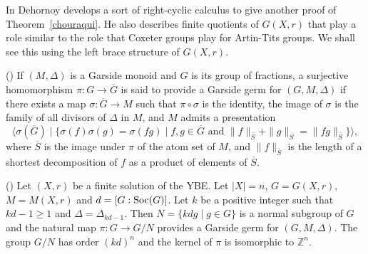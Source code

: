 In \cite{MR3374524} Dehornoy develops a sort of right-cyclic calculus to
give another proof of Theorem~\ref{chouraqui}. He also describes
finite quotients of $G(X,r)$ that play a role similar to the role
that Coxeter groups play for Artin-Tits groups. We shall see this
using the left brace structure of $G(X,r)$.

\begin{definition} (\cite[Definition~5.1]{MR3374524}) If $(M,\Delta)$ is a Garside
monoid and $G$ is its group of fractions, a surjective homomorphism
$\pi\colon G\longrightarrow \overline{G}$ is said to provide a
Garside germ for $(G,M,\Delta)$ if there exists a map
$\sigma\colon\overline{G}\longrightarrow M$ such that
$\pi\circ\sigma$ is the identity, the image of $\sigma$ is the
family of all divisors of $\Delta$ in $M$, and $M$ admits a
presentation
$$\langle \sigma(\overline{G})\mid \{ \sigma(f)\sigma(g)=\sigma(fg)\mid f,g\in \overline{G}\mbox{ and }\| f\|_{\overline{S}}+\| g\|_{\overline{S}}=\| fg\|_{\overline{S}} \}\rangle,$$
where $\overline{S}$ is the image under $\pi$ of the atom set of
$M$, and $\| f\|_{\overline{S}}$ is the length of a shortest
decomposition of $f$ as a product of elements of $\overline{S}$.
\end{definition}

\begin{proposition} (\cite[Proposition~5.2]{MR3374524}) Let $(X,r)$ be a finite
solution of the YBE. Let $|X|=n$, $G=G(X,r)$, $M=M(X,r)$ and $d=[G
:\operatorname{Soc}(G)]$. Let $k$ be a positive integer such that $kd-1\geq 1$ and
$\Delta=\Delta_{kd-1}$. Then $N=\{kdg\mid g\in G\}$ is a normal
subgroup of $G$ and the natural map $\pi\colon G\longrightarrow G/N$
provides a Garside germ for $(G,M,\Delta)$. The group $G/N$ has
order $(kd)^{n}$ and the kernel of $\pi$ is isomorphic to
$\mathbb{Z}^{n}$.
\end{proposition}

